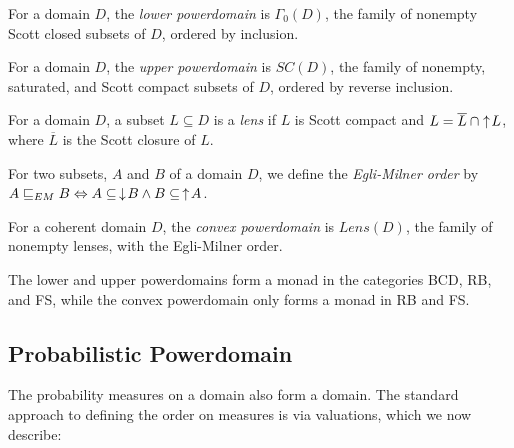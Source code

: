 \begin{definition}
For a domain $D$, the \emph{lower powerdomain} is $\Gamma_0 (D)$, the family of nonempty Scott closed subsets of $D$, ordered by inclusion.
\end{definition}

\begin{definition}
For a domain $D$, the \emph{upper powerdomain} is $SC(D)$, the family of nonempty, saturated, and Scott compact subsets of $D$, ordered by reverse inclusion.
\end{definition}

\begin{definition}
For a domain $D$, a subset $L\subseteq D$ is a \emph{lens} if $L$ is Scott compact and $L=\overline{L}\:\cap \!\,\uparrow\! L$, where $\overline{L}$ is the Scott closure of $L$.
\end{definition}

\begin{definition} \label{egli}
For two subsets, $A$ and $B$ of a domain $D$, we define the \emph{Egli-Milner order} by $A\sqsubseteq_{EM} B \Leftrightarrow A\subseteq \,\downarrow\! B \wedge B\subseteq \,\uparrow\! A$.
\end{definition}

\begin{definition}
For a coherent domain $D$, the \emph{convex powerdomain} is $Lens(D)$, the family of nonempty lenses, with the Egli-Milner order.
\end{definition}

The lower and upper powerdomains form a monad in the categories \textsf{BCD}, \textsf{RB}, and \textsf{FS}, while the convex powerdomain only forms a monad in \textsf{RB} and \textsf{FS}.

\subsection{Probabilistic Powerdomain}

The probability measures on a domain also form a domain.  The standard approach to defining the order on measures is via valuations, which we now describe:

